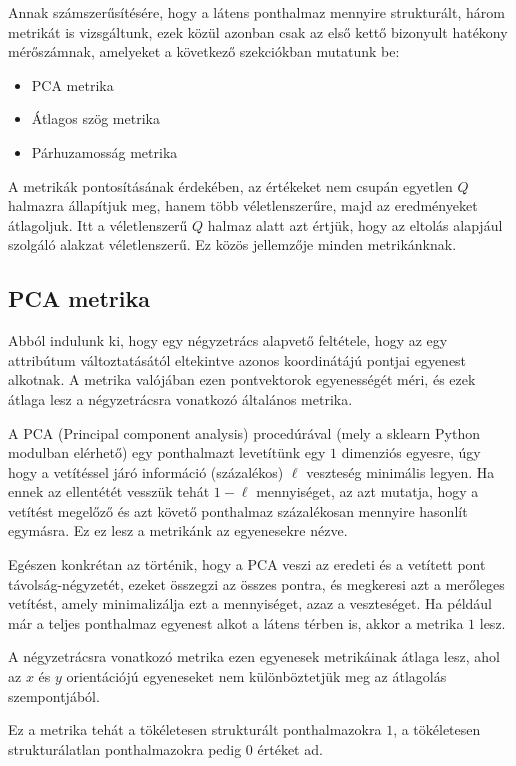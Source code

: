 Annak számszerűsítésére, hogy a látens ponthalmaz mennyire strukturált, három metrikát is vizsgáltunk, ezek közül azonban csak az első kettő bizonyult hatékony mérőszámnak, amelyeket a következő szekciókban mutatunk be:
\begin{itemize}
  \item PCA metrika
  \item Átlagos szög metrika
  \item Párhuzamosság metrika
\end{itemize}

A metrikák pontosításának érdekében, az értékeket nem csupán egyetlen $Q$ halmazra állapítjuk meg, hanem több véletlenszerűre,   majd az eredményeket átlagoljuk. Itt a véletlenszerű $Q$ halmaz alatt azt értjük, hogy az eltolás alapjául szolgáló alakzat véletlenszerű. Ez közös jellemzője minden metrikánknak.

\subsection{PCA metrika}

Abból indulunk ki, hogy egy négyzetrács alapvető feltétele, hogy az egy attribútum változtatásától eltekintve azonos koordinátájú pontjai egyenest alkotnak.  A metrika valójában ezen pontvektorok egyenességét méri, és ezek átlaga lesz a négyzetrácsra vonatkozó általános metrika.

A PCA (Principal component analysis) procedúrával (mely a sklearn Python modulban elérhető) egy ponthalmazt levetítünk egy $1$ dimenziós egyesre, úgy hogy a vetítéssel járó információ (százalékos) $\ell$ veszteség minimális legyen. Ha ennek az ellentétét vesszük tehát $1-\ell$ mennyiséget, az azt mutatja, hogy a vetítést megelőző és azt követő ponthalmaz százalékosan mennyire hasonlít egymásra. Ez ez lesz a metrikánk az egyenesekre nézve. 

Egészen konkrétan az történik, hogy a PCA veszi az eredeti és a vetített pont távolság-négyzetét, ezeket összegzi az összes pontra, és megkeresi azt a merőleges vetítést, amely minimalizálja ezt a mennyiséget, azaz a veszteséget.
Ha például már a teljes ponthalmaz egyenest alkot a látens térben is, akkor a metrika $1$ lesz.

A négyzetrácsra vonatkozó metrika ezen egyenesek metrikáinak átlaga lesz, ahol az $x$ és $y$ orientációjú egyeneseket nem különböztetjük meg az átlagolás szempontjából.

Ez a metrika tehát a tökéletesen strukturált ponthalmazokra $1$, a tökéletesen strukturálatlan ponthalmazokra pedig $0$ értéket ad.

